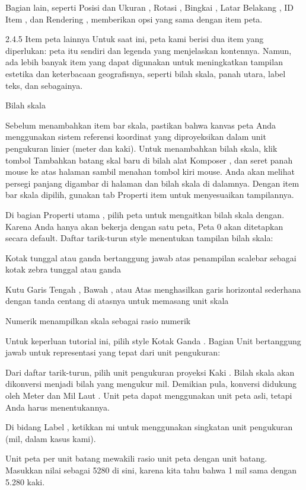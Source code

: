 \documentclass[]{book}
\begin{document}
Bagian lain, seperti Posisi dan Ukuran , Rotasi , Bingkai , Latar Belakang , ID Item , dan Rendering , memberikan opsi yang sama dengan item peta.

2.4.5 Item peta lainnya
Untuk saat ini, peta kami berisi dua item yang diperlukan: peta itu sendiri dan legenda yang menjelaskan kontennya. Namun, ada lebih banyak item yang dapat digunakan untuk meningkatkan tampilan estetika dan keterbacaan geografisnya, seperti bilah skala, panah utara, label teks, dan sebagainya.

Bilah skala

Sebelum menambahkan item bar skala, pastikan bahwa kanvas peta Anda menggunakan sistem referensi koordinat yang diproyeksikan dalam unit pengukuran linier (meter dan kaki). Untuk menambahkan bilah skala, klik tombol Tambahkan batang skal baru di bilah alat Komposer , dan seret panah mouse ke atas halaman sambil menahan tombol kiri mouse. Anda akan melihat persegi panjang digambar di halaman dan bilah skala di dalamnya. Dengan item bar skala dipilih, gunakan tab Properti item untuk menyesuaikan tampilannya.

Di bagian Properti utama , pilih peta untuk mengaitkan bilah skala dengan. Karena Anda hanya akan bekerja dengan satu peta, Peta 0 akan ditetapkan secara default. Daftar tarik-turun style menentukan tampilan bilah skala:

Kotak tunggal atau ganda bertanggung jawab atas penampilan scalebar sebagai kotak zebra tunggal atau ganda

Kutu Garis Tengah , Bawah , atau Atas menghasilkan garis horizontal sederhana dengan tanda centang di atasnya untuk memasang unit skala

Numerik menampilkan skala sebagai rasio numerik

Untuk keperluan tutorial ini, pilih style Kotak Ganda . Bagian Unit bertanggung jawab untuk representasi yang tepat dari unit pengukuran:

Dari daftar tarik-turun, pilih unit pengukuran proyeksi Kaki . Bilah skala akan dikonversi menjadi bilah yang mengukur mil. Demikian pula, konversi didukung oleh Meter dan Mil Laut . Unit peta dapat menggunakan unit peta asli, tetapi Anda harus menentukannya.

Di bidang Label , ketikkan mi untuk menggunakan singkatan unit pengukuran (mil, dalam kasus kami).

Unit peta per unit batang mewakili rasio unit peta dengan unit batang. Masukkan nilai sebagai 5280 di sini, karena kita tahu bahwa 1 mil sama dengan 5.280 kaki.
\end{document}
